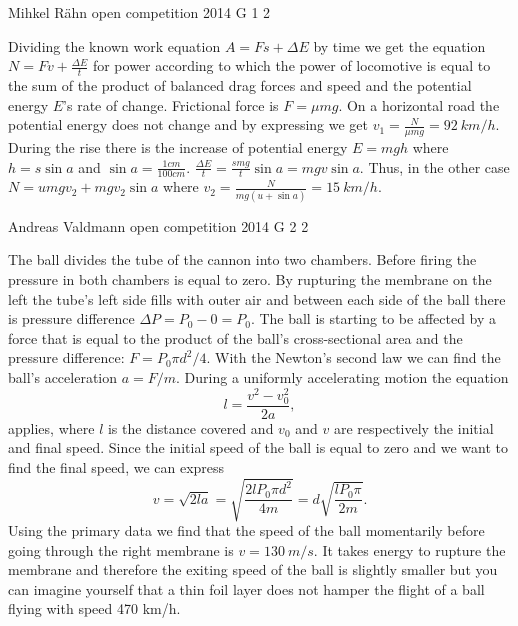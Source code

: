 \documentclass[11pt]{article}
\begin{document}
{Mihkel Rähn} %
{open competition} %
{2014} %
{G 1} %
{2} %
{

\ifEngSolution
Dividing the known work equation $A=Fs+\Delta E$ by time we get the equation $N=Fv+\frac{\Delta E}{t}$ for power according to which the power of locomotive is equal to the sum of the product of balanced drag forces and speed and the potential energy $E$’s rate of change. Frictional force is $F=\mu mg$. On a horizontal road the potential energy does not change and by expressing we get $v_1=\frac{N}{\mu mg}=\SI{92}{km \per h}$. During the rise there is the increase of potential energy $E=mgh$ where $h=s\sin a$ and $\sin a= \frac{1cm}{100cm}$. $\frac{\Delta E}{t}=\frac{smg}{t}\sin a=mgv\sin a$. Thus, in the other case $N=umgv_2+mgv_2\sin a$ where $v_2=\frac{N}{mg(u+\sin a)}=\SI{15}{km \per h}$.
\fi
}

{Andreas Valdmann} %
{open competition} %
{2014} %
{G 2} %
{2} %
{

\ifEngSolution
The ball divides the tube of the cannon into two chambers. Before firing the pressure in both chambers is equal to zero. By rupturing the membrane on the left the tube’s left side fills with outer air and between each side of the ball there is pressure difference $\Delta P=P_0-0=P_0$. The ball is starting to be affected by a force that is equal to the product of the ball’s cross-sectional area and the pressure difference: $F=P_0\pi d^2/4$. With the Newton’s second law we can find the ball’s acceleration $a=F/m$. During a uniformly accelerating motion the equation 
\[ l=\frac{v^2-v_0^2}{2a}, \] 
applies, where $l$ is the distance covered and $v_0$ and $v$ are respectively the initial and final speed. Since the initial speed of the ball is equal to zero and we want to find the final speed, we can express 
\[ v=\sqrt{2la}=\sqrt{\frac{2lP_0\pi d^2}{4m}}=d\sqrt{\frac{lP_0\pi}{2m}}.\] 
Using the primary data we find that the speed of the ball momentarily before going through the right membrane is $v=\SI{130}{m/s}$. It takes energy to rupture the membrane and therefore the exiting speed of the ball is slightly smaller but you can imagine yourself that a thin foil layer does not hamper the flight of a ball flying with speed 470 km/h.
\fi
}
\end{document}
